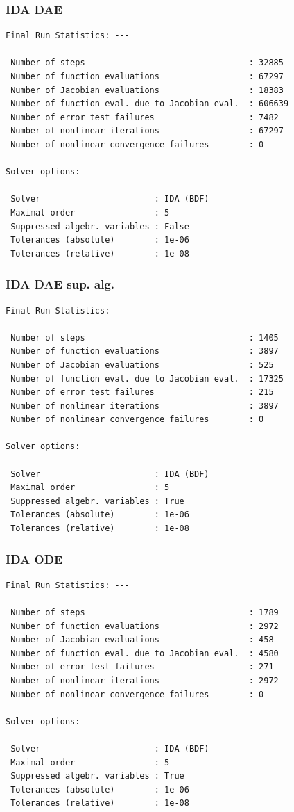 \documentclass[]{beamer}
\begin{document}
\begin{frame}[fragile]
\frametitle{IDA DAE}
{\small
\begin{verbatim}
Final Run Statistics: --- 

 Number of steps                                 : 32885
 Number of function evaluations                  : 67297
 Number of Jacobian evaluations                  : 18383
 Number of function eval. due to Jacobian eval.  : 606639
 Number of error test failures                   : 7482
 Number of nonlinear iterations                  : 67297
 Number of nonlinear convergence failures        : 0

Solver options:

 Solver                       : IDA (BDF)
 Maximal order                : 5
 Suppressed algebr. variables : False
 Tolerances (absolute)        : 1e-06
 Tolerances (relative)        : 1e-08
\end{verbatim}
}
\end{frame}

\begin{frame}[fragile]
\frametitle{IDA DAE sup. alg.}
{\small
\begin{verbatim}
Final Run Statistics: --- 

 Number of steps                                 : 1405
 Number of function evaluations                  : 3897
 Number of Jacobian evaluations                  : 525
 Number of function eval. due to Jacobian eval.  : 17325
 Number of error test failures                   : 215
 Number of nonlinear iterations                  : 3897
 Number of nonlinear convergence failures        : 0

Solver options:

 Solver                       : IDA (BDF)
 Maximal order                : 5
 Suppressed algebr. variables : True
 Tolerances (absolute)        : 1e-06
 Tolerances (relative)        : 1e-08
\end{verbatim}
}
\end{frame}

\begin{frame}[fragile]
\frametitle{IDA ODE}
{\small
\begin{verbatim}
Final Run Statistics: --- 

 Number of steps                                 : 1789
 Number of function evaluations                  : 2972
 Number of Jacobian evaluations                  : 458
 Number of function eval. due to Jacobian eval.  : 4580
 Number of error test failures                   : 271
 Number of nonlinear iterations                  : 2972
 Number of nonlinear convergence failures        : 0

Solver options:

 Solver                       : IDA (BDF)
 Maximal order                : 5
 Suppressed algebr. variables : True
 Tolerances (absolute)        : 1e-06
 Tolerances (relative)        : 1e-08
\end{verbatim}
}
\end{frame}
\end{document}

